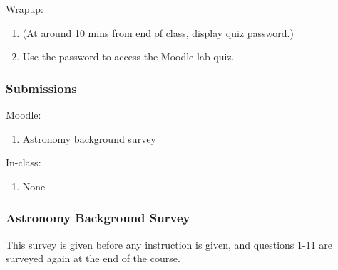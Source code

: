 \documentclass[12pt]{article}
\begin{document}
\noindent
Wrapup:
\begin{enumerate}
\item (At around 10 mins from end of class, display quiz password.)
\item Use the password to access the Moodle lab quiz.
\end{enumerate}


\subsubsection{Submissions}

Moodle:
\begin{enumerate}
\item Astronomy background survey
\end{enumerate}

\noindent
In-class:
\begin{enumerate}
\item None
\end{enumerate}


\subsubsection{Astronomy Background Survey}

This survey is given before any instruction is given, and questions 1-11 are surveyed again at the end of the course.
\end{document}
